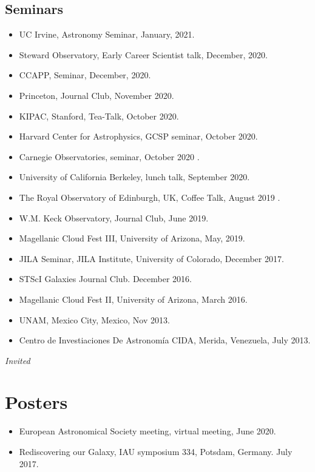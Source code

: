 \documentclass[UTF8]{article}
\begin{document}
\subsection*{Seminars}
\begin{itemize}
  \setlength\itemsep{0.0em}
  \renewcommand\labelitemi{$\cdot$}

\item UC Irvine, Astronomy Seminar, January, 2021. \dag
\item Steward Observatory, Early Career Scientist talk, December, 2020. \dag
\item CCAPP, Seminar, December, 2020. \dag
\item Princeton, Journal Club, November 2020. \dag
\item KIPAC, Stanford, Tea-Talk, October 2020.
\item Harvard Center for Astrophysics, GCSP seminar, October 2020.
\item Carnegie Observatories, seminar, October 2020 \dag.
\item University of California Berkeley, lunch talk, September 2020. 
\item The Royal Observatory of Edinburgh, UK, Coffee Talk, August 2019 \dag.
\item W.M. Keck Observatory, Journal Club, June 2019.
\item Magellanic Cloud Fest III, University of Arizona, May, 2019.
\item JILA Seminar, JILA Institute, University of Colorado, December 2017.
\item STScI Galaxies Journal Club. December 2016.
\item Magellanic Cloud Fest II, University of Arizona, March 2016.
\item UNAM, Mexico City, Mexico, Nov 2013. 
\item Centro de Investiaciones De Astronom\'ia CIDA, Merida, Venezuela, July 2013.
\end{itemize}
\indent \dag \textit{Invited}

\section*{Posters}
\begin{itemize}
\setlength\itemsep{0.0em}
\renewcommand\labelitemi{$\cdot$}
  \item European Astronomical Society meeting, virtual meeting, June 2020.
  \item Rediscovering our Galaxy, IAU symposium 334, Potsdam, Germany. July 2017.
\end{itemize}
 
\end{document}
